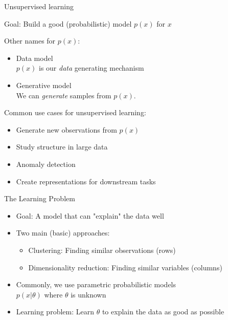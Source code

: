\documentclass[10pt]{beamer}
\begin{document}
\begin{frame}{Unsupervised learning}

{\color{uured} Goal}: Build a good (probabilistic) model $p(x)$ for $x$

\pause

Other names for $p(x)$:
\begin{itemize}
\item {\color{uured} Data} model\\ $p(x)$ is our \emph{data} generating mechanism
\item {\color{uured} Generative} model\\ We can \emph{generate} samples from $p(x)$.
\end{itemize}
\pause
Common use cases for unsupervised learning:
\begin{itemize}
\item Generate new observations from $p(x)$ %
\item Study structure in large data %
\item Anomaly detection %
\item Create representations for downstream tasks %
\end{itemize}

\end{frame}


\begin{frame}{The Learning Problem}

\begin{itemize}
\item {\color{uured} Goal}: A model that can "explain" the data well
\item Two main (basic) approaches:
\begin{itemize}
\item {\color{uured} Clustering}: Finding similar {\color{uured} observations} (rows)
\item {\color{uured} Dimensionality reduction}: Finding similar {\color{uured} variables} (columns)
\end{itemize}
\pause
\item Commonly, we use parametric probabilistic models\\ $p(x|\theta)$ where $\theta$ is unknown
\item {\color{uured} Learning problem}: Learn $\theta$ to explain the data as good as possible
\end{itemize}

\end{frame}
\end{document}
